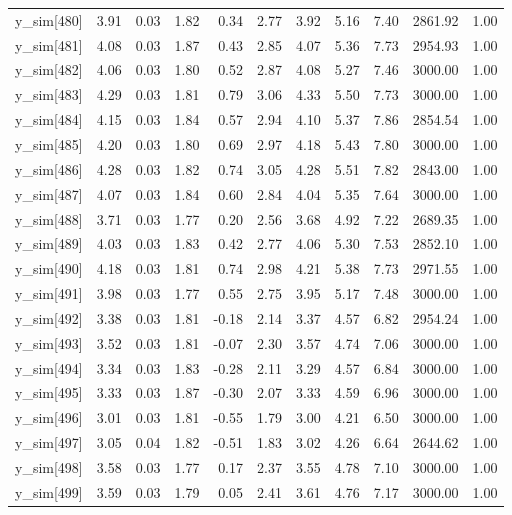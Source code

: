 \begin{table}[ht]
\begin{tabular}{rrrrrrrrrrr}
  y\_sim[480] & 3.91 & 0.03 & 1.82 & 0.34 & 2.77 & 3.92 & 5.16 & 7.40 & 2861.92 & 1.00 \\ 
  y\_sim[481] & 4.08 & 0.03 & 1.87 & 0.43 & 2.85 & 4.07 & 5.36 & 7.73 & 2954.93 & 1.00 \\ 
  y\_sim[482] & 4.06 & 0.03 & 1.80 & 0.52 & 2.87 & 4.08 & 5.27 & 7.46 & 3000.00 & 1.00 \\ 
  y\_sim[483] & 4.29 & 0.03 & 1.81 & 0.79 & 3.06 & 4.33 & 5.50 & 7.73 & 3000.00 & 1.00 \\ 
  y\_sim[484] & 4.15 & 0.03 & 1.84 & 0.57 & 2.94 & 4.10 & 5.37 & 7.86 & 2854.54 & 1.00 \\ 
  y\_sim[485] & 4.20 & 0.03 & 1.80 & 0.69 & 2.97 & 4.18 & 5.43 & 7.80 & 3000.00 & 1.00 \\ 
  y\_sim[486] & 4.28 & 0.03 & 1.82 & 0.74 & 3.05 & 4.28 & 5.51 & 7.82 & 2843.00 & 1.00 \\ 
  y\_sim[487] & 4.07 & 0.03 & 1.84 & 0.60 & 2.84 & 4.04 & 5.35 & 7.64 & 3000.00 & 1.00 \\ 
  y\_sim[488] & 3.71 & 0.03 & 1.77 & 0.20 & 2.56 & 3.68 & 4.92 & 7.22 & 2689.35 & 1.00 \\ 
  y\_sim[489] & 4.03 & 0.03 & 1.83 & 0.42 & 2.77 & 4.06 & 5.30 & 7.53 & 2852.10 & 1.00 \\ 
  y\_sim[490] & 4.18 & 0.03 & 1.81 & 0.74 & 2.98 & 4.21 & 5.38 & 7.73 & 2971.55 & 1.00 \\ 
  y\_sim[491] & 3.98 & 0.03 & 1.77 & 0.55 & 2.75 & 3.95 & 5.17 & 7.48 & 3000.00 & 1.00 \\ 
  y\_sim[492] & 3.38 & 0.03 & 1.81 & -0.18 & 2.14 & 3.37 & 4.57 & 6.82 & 2954.24 & 1.00 \\ 
  y\_sim[493] & 3.52 & 0.03 & 1.81 & -0.07 & 2.30 & 3.57 & 4.74 & 7.06 & 3000.00 & 1.00 \\ 
  y\_sim[494] & 3.34 & 0.03 & 1.83 & -0.28 & 2.11 & 3.29 & 4.57 & 6.84 & 3000.00 & 1.00 \\ 
  y\_sim[495] & 3.33 & 0.03 & 1.87 & -0.30 & 2.07 & 3.33 & 4.59 & 6.96 & 3000.00 & 1.00 \\ 
  y\_sim[496] & 3.01 & 0.03 & 1.81 & -0.55 & 1.79 & 3.00 & 4.21 & 6.50 & 3000.00 & 1.00 \\ 
  y\_sim[497] & 3.05 & 0.04 & 1.82 & -0.51 & 1.83 & 3.02 & 4.26 & 6.64 & 2644.62 & 1.00 \\ 
  y\_sim[498] & 3.58 & 0.03 & 1.77 & 0.17 & 2.37 & 3.55 & 4.78 & 7.10 & 3000.00 & 1.00 \\ 
  y\_sim[499] & 3.59 & 0.03 & 1.79 & 0.05 & 2.41 & 3.61 & 4.76 & 7.17 & 3000.00 & 1.00 \\ 

\end{tabular}
\end{table}
